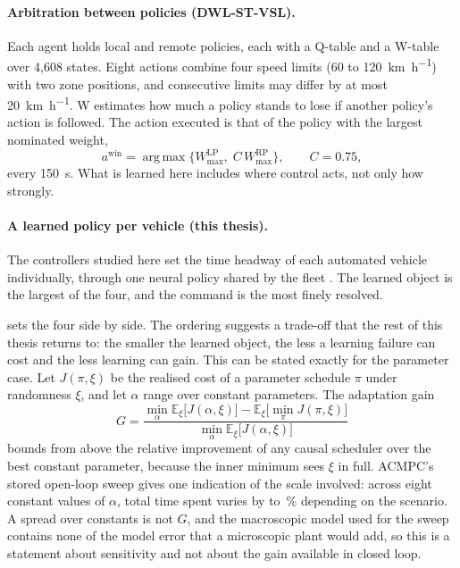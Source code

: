 \paragraph{Arbitration between policies (DWL-ST-VSL).}
Each agent holds local and remote policies, each with a Q-table and a W-table over 4{,}608 states. Eight actions combine four speed limits (60 to \SI{120}{\kilo\metre\per\hour}) with two zone positions, and consecutive limits may differ by at most \SI{20}{\kilo\metre\per\hour}. W estimates how much a policy stands to lose if another policy's action is followed. The action executed is that of the policy with the largest nominated weight,
\begin{equation}
a^{\mathrm{win}}=\operatorname*{arg\,max}\bigl\{W^{\mathrm{LP}}_{\max},\;C\,W^{\mathrm{RP}}_{\max}\bigr\},\qquad C=0.75,
\end{equation}
every \SI{150}{\second}. What is learned here includes where control acts, not only how strongly.

\paragraph{A learned policy per vehicle (this thesis).}
The controllers studied here set the time headway of each automated vehicle individually, through one neural policy shared by the fleet . The learned object is the largest of the four, and the command is the most finely resolved.

\medskip
{} sets the four side by side. The ordering suggests a trade-off that the rest of this thesis returns to: the smaller the learned object, the less a learning failure can cost and the less learning can gain. This can be stated exactly for the parameter case. Let $J(\pi,\xi)$ be the realised cost of a parameter schedule $\pi$ under randomness $\xi$, and let $\alpha$ range over constant parameters. The adaptation gain
\begin{equation}
G=\frac{\min_{\alpha}\mathbb{E}_{\xi}\bigl[J(\alpha,\xi)\bigr]-\mathbb{E}_{\xi}\bigl[\min_{\pi}J(\pi,\xi)\bigr]}{\min_{\alpha}\mathbb{E}_{\xi}\bigl[J(\alpha,\xi)\bigr]}\label{eq:adaptation-gain}
\end{equation}
bounds from above the relative improvement of any causal scheduler over the best constant parameter, because the inner minimum sees $\xi$ in full. ACMPC's stored open-loop sweep gives one indication of the scale involved: across eight constant values of $\alpha$, total time spent varies by \OIAcSweepMin{} to \OIAcSweepMax{}\,\% depending on the scenario. A spread over constants is not $G$, and the macroscopic model used for the sweep contains none of the model error that a microscopic plant would add, so this is a statement about sensitivity and not about the gain available in closed loop.

